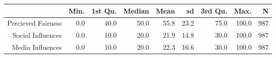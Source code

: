 \begin{table}[ht]
\centering
\begin{tabular}{rrrrrrrrr}
  \hline
 & Min. & 1st Qu. & Median & Mean & sd & 3rd Qu. & Max. & N \\ 
  \hline
Percieved Fairness & 0.0 & 40.0 & 50.0 & 55.8 & 23.2 & 75.0 & 100.0 & 987 \\ 
  Social Influences & 0.0 & 10.0 & 20.0 & 21.9 & 14.8 & 30.0 & 100.0 & 987 \\ 
  Media Influences & 0.0 & 10.0 & 20.0 & 22.3 & 16.6 & 30.0 & 100.0 & 987 \\ 
   \hline
\end{tabular}
\end{table}
